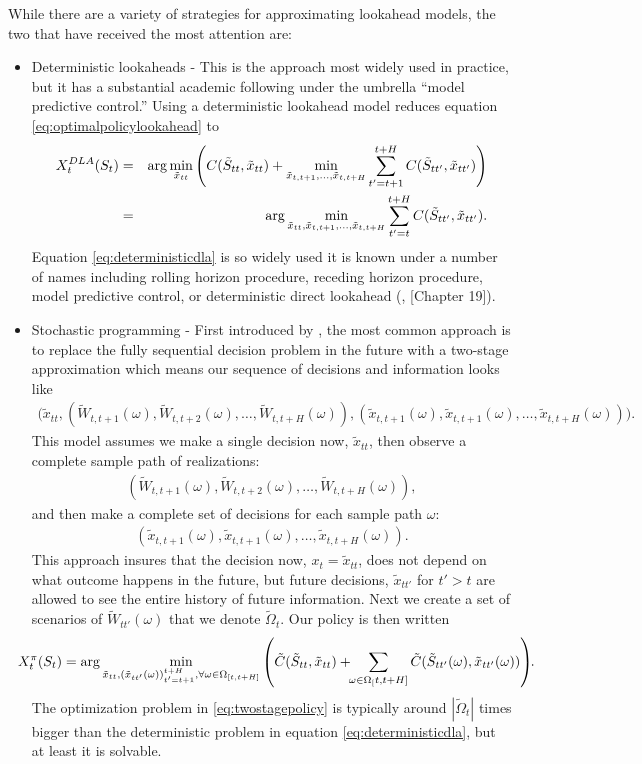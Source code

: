\documentclass[11pt,oneside,fleqn,reqno,titlepage]{article}
\newcommand{\bn}{\begin{eqnarray}}
\newcommand{\en}{\end{eqnarray}}
\newcommand{\bns}{\begin{eqnarray*}}
\newcommand{\ens}{\end{eqnarray*}}
\newcommand{\argmin}{{\rm arg}\min}
\def \xtilde{{\tilde x}}
\def \Ctilde{{\tilde C}}
\def \Stilde{{\tilde S}}
\def \Wtilde{{\tilde W}}
\def \Omegatilde{{\tilde \Omega}}
\begin{document}
While there are a variety of strategies for approximating lookahead models, the two that have received the most attention are:
\begin{itemize}
    \item{Deterministic lookaheads} - This is the approach most widely used in practice, but it has a substantial academic following under the umbrella ``model predictive control.'' Using a deterministic lookahead model reduces  equation \eqref{eq:optimalpolicylookahead} to
    \bn
    X^{DLA}_t(S_t) &=& \argmin_{\xtilde_{tt}} \left(C(\Stilde_{tt},\xtilde_{tt}) + \min_{\xtilde_{t,t+1},\ldots,\xtilde_{t,t+H}} \sum_{t'=t+1}^{t+H} C(\Stilde_{tt'},\xtilde_{tt'})\right) \nonumber\\
               &=& \argmin_{\xtilde_{tt},\xtilde_{t,t+1},\ldots,\xtilde_{t,t+H}}  \sum_{t'=t}^{t+H} C(\Stilde_{tt'},\xtilde_{tt'}). \label{eq:deterministicdla}
    \en
    Equation \eqref{eq:deterministicdla} is so widely used it is known under a number of names including rolling horizon procedure, receding horizon procedure, model predictive control, or deterministic direct lookahead (\cite{sethi1991theory,camacho2013model}, \cite{PowellRLSO}[Chapter 19]).
%
    \item{Stochastic programming} - First introduced by  \cite{Da55}, the most common approach is to replace the fully sequential decision problem in the future with a two-stage approximation which means our sequence of decisions and information looks like
    \bns
    \big(\xtilde_{tt}, (\Wtilde_{t,t+1}(\omega),\Wtilde_{t,t+2}(\omega), \ldots, \Wtilde_{t,t+H}(\omega)),(\xtilde_{t,t+1}(\omega),\xtilde_{t,t+1}(\omega),\ldots, \xtilde_{t,t+H}(\omega))\big).
    \ens
    This model assumes we make a single decision now, $\xtilde_{tt}$, then observe a complete sample path of realizations:
    \bns
    (\Wtilde_{t,t+1}(\omega),\Wtilde_{t,t+2}(\omega), \ldots, \Wtilde_{t,t+H}(\omega)),
    \ens
    and then make a complete set of decisions for each sample path $\omega$:
    \bns
    (\xtilde_{t,t+1}(\omega),\xtilde_{t,t+1}(\omega),\ldots, \xtilde_{t,t+H}(\omega)).
    \ens
    This approach insures that the decision now, $x_t=\xtilde_{tt}$, does not depend on what outcome happens in the future, but future decisions, $\xtilde_{tt'}$ for $t' > t$ are allowed to see the entire history of future information.  Next we create a set of scenarios of $\Wtilde_{tt'}(\omega)$ that we denote $\Omegatilde_t$.  Our policy is then written
    \bn
    \hspace{-.15in}X^\pi_t(S_t) = \argmin_{\xtilde_{tt},(\xtilde_{tt'}(\omega))_{t'=t+1}^{t+H},\forall \omega\in\Omega_{[t,t+H]}} \left(\Ctilde(\Stilde_{tt},\xtilde_{tt}) + \hspace{-.05in} \sum_{\omega\in\Omega_[t,t+H]} \Ctilde(\Stilde_{tt'}(\omega),\xtilde_{tt'}(\omega))\right)\hspace{-.04in}. \label{eq:twostagepolicy}
    \en
    The optimization problem in \eqref{eq:twostagepolicy} is typically around $|\Omegatilde_t|$ times bigger than the deterministic problem in equation \eqref{eq:deterministicdla}, but at least it is solvable.
\end{itemize}
\end{document}
